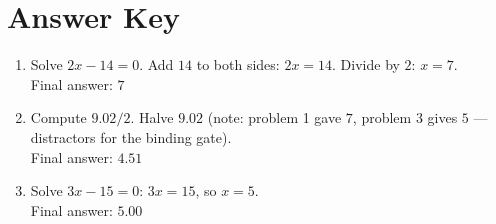 \documentclass[12pt]{article}
\begin{document}
\section*{Answer Key}

\begin{enumerate}
  \item Solve $2x - 14 = 0$. Add $14$ to both sides: $2x = 14$.
        Divide by $2$: $x = 7$.\\
        Final answer: $\boxed{7}$
  \item Compute $9.02 / 2$. Halve $9.02$ (note: problem 1 gave $7$, problem
        3 gives $5$ — distractors for the binding gate).\\
        Final answer: $\boxed{4.51}$
  \item Solve $3x - 15 = 0$: $3x = 15$, so $x = 5$.\\
        Final answer: $\boxed{5.00}$
\end{enumerate}
\end{document}

